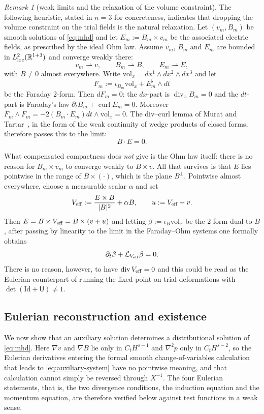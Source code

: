 \documentclass[11pt,reqno]{amsart}
\theoremstyle{plain}
\theoremstyle{definition}
\theoremstyle{remark}
\newtheorem{remark}[theorem]{Remark}
\numberwithin{equation}{section}
\DeclareMathOperator{\Div}{div}
\DeclareMathOperator{\curl}{curl}
\newcommand{\Ufield}{\mathsf U}
\newcommand{\Real}{\mathbb R}
\begin{document}
\begin{remark}[weak limits and the relaxation of the volume constraint]
\label{rem:weak-limit-heuristic}
The following heuristic, stated in $n=3$ for concreteness, indicates that
dropping the volume constraint on the trial fields is the natural relaxation.
Let $(v_m,B_m)$ be smooth solutions of \eqref{eq:mhd} and let
$E_m:=B_m\times v_m$ be the associated electric fields, as prescribed by
the ideal Ohm law. Assume $v_m$, $B_m$ and $E_m$ are bounded in
$L^2_{\rm loc}(\Real^{1+3})$ and converge weakly there:
\[
 v_m\rightharpoonup v,\qquad B_m\rightharpoonup B,\qquad
 E_m\rightharpoonup E,
\]
with $B\neq0$ almost everywhere.  Write $\mathrm{vol}_x=dx^1\wedge dx^2\wedge
dx^3$ and let
\[
 F_m:=\iota_{B_m}\mathrm{vol}_x+E_m^\flat\wedge dt
\]
be the Faraday $2$-form. Then $dF_m=0$: the $dx$-part is $\Div_xB_m=0$ and the
$dt$-part is Faraday's law $\partial_tB_m+\curl E_m=0$. Moreover
$F_m\wedge F_m=-2(B_m\cdot E_m)dt\wedge\mathrm{vol}_x=0$. The div--curl lemma of Murat and
Tartar~\cite{Murat1978,Tartar1979}, in the form of the weak continuity of wedge
products of closed forms, therefore passes this to the limit:
\[
 B\cdot E=0 .
\]
 
What compensated compactness does \emph{not} give is the Ohm law itself: there
is no reason for $B_m\times v_m$ to converge weakly to $B\times v$. All that
survives is that $E$ lies pointwise in the range of $B\times(\cdot)$,
which is the plane $B^\perp$. Pointwise almost everywhere, choose a measurable
scalar $\alpha$ and set
\[
 V_{\rm eff}:=\frac{E\times B}{|B|^2}+\alpha B,
 \qquad
 u:=V_{\rm eff}-v.
\]
Then $E=B\times V_{\rm eff}=B\times(v+u)$ and letting
$\beta:=\iota_B\mathrm{vol}_x$ be the
$2$-form dual to $B$, after passing by linearity to the limit in the Faraday--Ohm systems one formally obtains
\[
 \partial_t\beta+\mathcal L_{V_{\rm eff}}\beta=0.
\]
There is no reason, however, to have $\Div V_{\rm eff}=0$ and this could be read as the Eulerian counterpart of running the fixed point on trial
deformations with $\det(\mathrm{Id}+\Ufield)\neq1$.
\end{remark}

\subsection{Eulerian reconstruction and existence}
\label{ssec:eulerian}

We now show that an auxiliary solution determines a distributional solution of
\eqref{eq:mhd}.
Here $\nabla v$ and $\nabla B$ lie only in $C_tH^{s-1}$ and $\nabla^2p$ only in
$C_tH^{s-2}$, so the Eulerian derivatives entering the formal smooth change-of-variables
calculation that leads to \eqref{eq:auxiliary-system} have no pointwise meaning,
and that calculation cannot simply be reversed through $X^{-1}$.  The four Eulerian statements, that is, the two
divergence conditions, the induction equation and the momentum equation, are therefore
verified below against test functions in a weak sense. 
\end{document}
